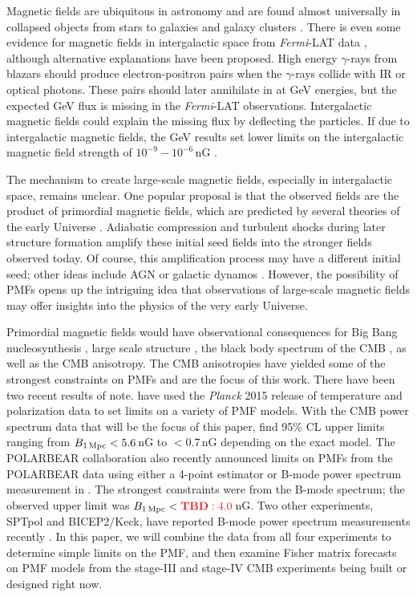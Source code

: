 \documentclass[preprint]{emulateapj}
\newcommand{\bpmf}{\ensuremath{B_{\rm 1\,Mpc}}}
\newcommand{\fermilat}{\textit{Fermi}-LAT}
\newcommand{\planck}{{\sl Planck}}
\newcommand{\bicepkeck}{BICEP2/Keck}
\newcommand{\pb}{POLARBEAR}
\newcommand{\sptpol}{SPTpol}
\newcommand{\tbd}[1]{\textcolor{Red}{{\bf TBD}: #1}}
\begin{document}
Magnetic fields are ubiquitous in astronomy and are found almost universally in collapsed objects from stars to galaxies and galaxy clusters \citep[for review, see][]{ryu12, widrow12}. 
There is even some evidence for magnetic fields in intergalactic space from \fermilat{} data \citep{neronov10}, although alternative explanations \citep{broderick12} have been proposed. 
High energy $\gamma$-rays from blazars should  produce electron-positron pairs when the $\gamma$-rays collide with IR or optical photons. 
These pairs should later annihilate in at GeV energies, but the expected GeV flux is missing in the \fermilat{} observations. 
Intergalactic magnetic fields could explain the missing flux by deflecting the particles. 
If due to intergalactic magnetic fields, the GeV results set lower limits on the intergalactic magnetic field strength of $10^{-9} - 10^{-6}$\,nG \citep{tavecchio10,taylor11,dermer11,vovk12}. 

The mechanism to create large-scale magnetic fields, especially in intergalactic space, remains unclear. 
One popular proposal is that the observed fields are the product of primordial magnetic fields, which are predicted by several theories of the early Universe \citep[e.g.,][]{turner88, grasso98,ichiki06}. 
Adiabatic compression and turbulent shocks during later structure formation amplify these initial seed fields into the stronger fields observed today. 
Of course, this amplification process may have a different initial seed; other ideas include AGN or galactic dynamos \citep[for a review, see][]{giovannini04}. 
However, the possibility of PMFs opens up the intriguing idea that observations of large-scale magnetic fields may offer insights into the physics of the very early Universe. 


Primordial magnetic fields would have observational consequences for Big Bang nucleosynthesis \citep[e..,][]{kahniashvili10}, large scale structure \citep[e.g.,][]{battaner97}, the black body spectrum of the CMB \citep[e.g.,][]{kunze14}, as well as the CMB anisotropy. 
The CMB anisotropies have yielded some of the strongest constraints on PMFs and are the focus of this work.
There have been two recent results of note. 
\citet{planck15-19} have used the \planck{} 2015 release of temperature and polarization data to set limits on a variety of PMF models. 
With the CMB power spectrum data that will be the focus of this paper, \citet{planck15-19} find 95\% CL upper limits ranging from $\bpmf < 5.6$\,nG to $<0.7$\,nG depending on the exact model. 
The \pb{} collaboration also recently announced limits on PMFs from the \pb{} data using either a 4-point estimator or B-mode power spectrum measurement in \citep{pb}. 
The strongest constraints were from the B-mode spectrum; the observed upper limit was $\bpmf < \tbd{4.0}$\,nG. 
Two other experiments, \sptpol{} and \bicepkeck{}, have reported B-mode power spectrum measurements recently \citep{}.
In this paper, we will combine the data from all four experiments to determine simple limits on the PMF, and then examine Fisher matrix forecasts on PMF models from the stage-III and stage-IV CMB experiments being built or designed right now. 
\end{document}
